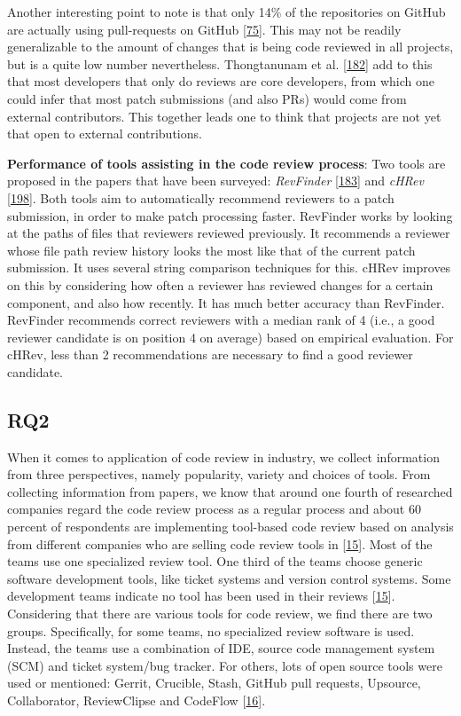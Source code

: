 \documentclass[]{book}
\begin{document}
Another interesting point to note is that only 14\% of the repositories
on GitHub are actually using pull-requests on GitHub
{[}\protect\hyperlink{ref-gousios2014exploratory}{75}{]}. This may not
be readily generalizable to the amount of changes that is being code
reviewed in all projects, but is a quite low number nevertheless.
Thongtanunam et al.
{[}\protect\hyperlink{ref-thongtanunam2016revisiting}{182}{]} add to
this that most developers that only do reviews are core developers, from
which one could infer that most patch submissions (and also PRs) would
come from external contributors. This together leads one to think that
projects are not yet that open to external contributions.

\textbf{Performance of tools assisting in the code review process}: Two
tools are proposed in the papers that have been surveyed:
\emph{RevFinder}
{[}\protect\hyperlink{ref-thongtanunam2015should}{183}{]} and
\emph{cHRev}
{[}\protect\hyperlink{ref-zanjani2016automatically}{198}{]}. Both tools
aim to automatically recommend reviewers to a patch submission, in order
to make patch processing faster. RevFinder works by looking at the paths
of files that reviewers reviewed previously. It recommends a reviewer
whose file path review history looks the most like that of the current
patch submission. It uses several string comparison techniques for this.
cHRev improves on this by considering how often a reviewer has reviewed
changes for a certain component, and also how recently. It has much
better accuracy than RevFinder. RevFinder recommends correct reviewers
with a median rank of 4 (i.e., a good reviewer candidate is on position
4 on average) based on empirical evaluation. For cHRev, less than 2
recommendations are necessary to find a good reviewer candidate.

\subsection{RQ2}\label{rq2}

When it comes to application of code review in industry, we collect
information from three perspectives, namely popularity, variety and
choices of tools. From collecting information from papers, we know that
around one fourth of researched companies regard the code review process
as a regular process and about 60 percent of respondents are
implementing tool-based code review based on analysis from different
companies who are selling code review tools in
{[}\protect\hyperlink{ref-baum2017choice}{15}{]}. Most of the teams use
one specialized review tool. One third of the teams choose generic
software development tools, like ticket systems and version control
systems. Some development teams indicate no tool has been used in their
reviews {[}\protect\hyperlink{ref-baum2017choice}{15}{]}. Considering
that there are various tools for code review, we find there are two
groups. Specifically, for some teams, no specialized review software is
used. Instead, the teams use a combination of IDE, source code
management system (SCM) and ticket system/bug tracker. For others, lots
of open source tools were used or mentioned: Gerrit, Crucible, Stash,
GitHub pull requests, Upsource, Collaborator, ReviewClipse and CodeFlow
{[}\protect\hyperlink{ref-baum2016faceted}{16}{]}.
\end{document}

